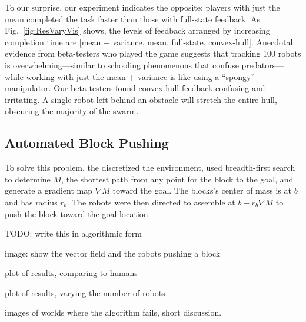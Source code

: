 To our surprise, our experiment indicates the opposite: players  with just the mean completed the task faster than those with full-state feedback.  As Fig.~\ref{fig:ResVaryVis} shows, the levels of feedback arranged by increasing completion time are [mean + variance, mean, full-state, convex-hull].  Anecdotal evidence from beta-testers who played the game suggests that tracking 100 robots is overwhelming---similar to schooling phenomenons that confuse predators---while working with just the mean + variance is like using a ``spongy'' manipulator. Our beta-testers found convex-hull feedback confusing and irritating.  A single robot left behind an obstacle will stretch the entire hull, obscuring the majority of the swarm.


\subsection{Automated Block Pushing}

To solve this problem, the discretized the environment, used breadth-first search to determine $M$, the shortest path from any point for the block to the goal, and generate a gradient map $\nabla M$ toward the goal.  The blocks's center of mass is at $b$ and has radius $r_b$. The robots were then directed to assemble at  $b - r_b \nabla M$ to push the block toward the goal location.


TODO: write this in algorithmic form

image:  show the vector field and the robots pushing a block

plot of results, comparing to humans

plot of results, varying the number of robots %

images of worlds where the algorithm fails, short discussion.






